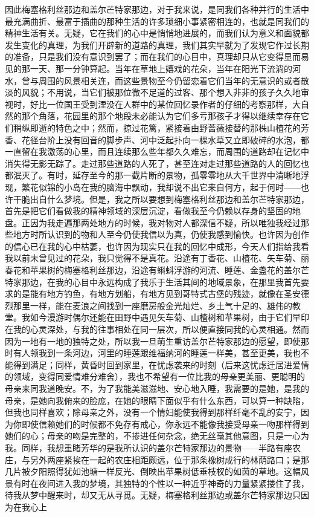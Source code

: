 \par 因此梅塞格利丝那边和盖尔芒特家那边，对于我来说，是同我们各种并行的生活中最充满曲折、最富于插曲的那种生活的许多琐细小事紧密相连的，也就是同我们的精神生活有关。无疑，它在我们的心中是悄悄地进展的，而我们认为意义和面貌都发生变化的真理，为我们开辟新的道路的真理，我们其实早就为了发现它作过长期的准备，只是我们没有意识到罢了；而在我们的心目中，真理却只从它变得显而易见的那一天、那一分钟算起。当年在草地上嬉戏的花朵，当年在阳光下流淌的河水，曾与周围的风景相关连，而这些景物至今仍留恋着它们当年的无意识的或者散淡的风貌；不用说，当它们被那位微不足道的过客、那个想入非非的孩子久久地审视时，好比一位国王受到湮没在人群中的某位回忆录作者的仔细的考察那样，大自然的那个角落，花园里的那个地段未必能认为它们多亏那孩子才得以继续幸存在它们稍纵即逝的特色之中；然而，掠过花篱，紧接着由野蔷薇接替的那株山楂花的芳香、花径台阶上没有回音的脚步声、河中泛起扑向一棵水草又立即破碎的水泡，都一直留在我激荡的心里，而且连续那么些年都久久难忘，而周围的道路却在记忆中消失得无影无踪了。走过那些道路的人死了，甚至连对走过那些道路的人的回忆也都泯灭了。有时，延存至今的那一截片断的景物，孤零零地从大千世界中清晰地浮现，繁花似锦的小岛在我的脑海中飘动，我却说不出它来自何方，起于何时——也许干脆出自什么梦境。但是，我之所以要想到梅塞格利丝那边和盖尔芒特家那边，首先是把它们看做我的精神领域的深层沉淀，看做我至今仍赖以存身的坚固的地盘。正因为我走遍那两处地方的时候，我对物对人都深信不疑，所以唯独我经过那些地方时所认识到的物和人至今仍使我信以为真，仍使我感到愉快。也许因为创作的信心已在我的心中枯萎，也许因为现实只在我的回忆中成形，今天人们指给我看我以前未曾见过的花朵，我只觉得不是真花。沿途有丁香花、山楂花、矢车菊、丽春花和苹果树的梅塞格利丝那边，沿途有蝌蚪浮游的河流、睡莲、金盏花的盖尔芒特家那边，在我的心目中永远构成了我乐于生活其间的地域景象，在那里我首先要求的是能有地方钓鱼，有地方划船，有地方见到哥特式古堡的残迹，就像在圣安德烈那里一样，能在麦浪之间找到一座磨房般金光灿烂、乡土气十足的、雄伟的教堂。我如今漫游时偶尔还能在田野中遇见矢车菊、山楂树和苹果树，由于它们早印在我的心灵深处，与我的往事相处在同一层次，所以便直接同我的心灵相通。然而因为一地有一地的独特之处，所以我一旦萌生重访盖尔芒特家那边的愿望，即使那时有人领我到一条河边，河里的睡莲跟维福纳河的睡莲一样美，甚至更美，我也不能得到满足；同样，黄昏时回到家里，在忧虑袭来的时刻（后来这忧虑迁居进爱情的领域，变得同爱情难分难舍），我也不希望有一位比我的母亲更美丽、更聪明的母亲来同我道晚安。不，为了我能美滋滋地、安心地入睡，我需要的是她，是我的母亲，是她向我俯来的脸庞，在她的眼睛下面似乎有什么东西，可以算一种缺陷，但我也同样喜欢；除母亲之外，没有一个情妇能使我得到那样纤毫不乱的安宁，因为你即使信赖她们的时候都不免存有戒心，你永远不能像我接受母亲一吻那样得到她们的心；母亲的吻是完整的，不掺进任何杂念，绝无丝毫其他意图，只是一心为我。同样，我想重睹芳华的是我所认识的盖尔芒特家那边的景物——半路有座农庄，与另外两座紧挨在一起的农庄相距颇远，位于那条橡树成行的林荫路口；是那几片被夕阳照得犹如池塘一样反光、倒映出苹果树低垂枝杈的如茵的草地。这幅风景有时在夜间进入我的梦境，其独特的个性以一种近乎神奇的力量紧紧搂住了我，待我从梦中醒来时，却又无从寻觅。无疑，梅塞格利丝那边或盖尔芒特家那边只因为在我心上